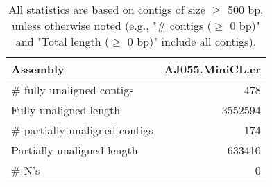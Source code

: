 \documentclass[12pt,a4paper]{article}
\begin{document}
\begin{table}[ht]
\begin{center}
\caption{All statistics are based on contigs of size $\geq$ 500 bp, unless otherwise noted (e.g., "\# contigs ($\geq$ 0 bp)" and "Total length ($\geq$ 0 bp)" include all contigs).}
\begin{tabular}{|l*{1}{|r}|}
\hline
Assembly & AJ055.MiniCL.cr \\ \hline
\# fully unaligned contigs & 478 \\ \hline
Fully unaligned length & 3552594 \\ \hline
\# partially unaligned contigs & 174 \\ \hline
Partially unaligned length & 633410 \\ \hline
\# N's & 0 \\ \hline
\end{tabular}
\end{center}
\end{table}
\end{document}
